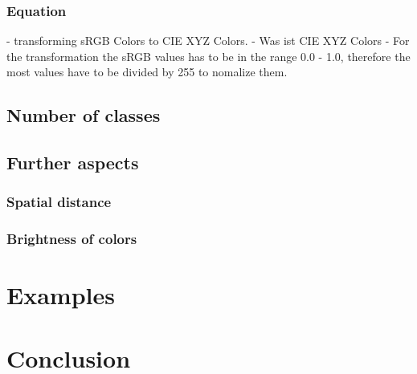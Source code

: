 \subsubsection{Equation}

- transforming sRGB Colors to CIE XYZ Colors. 
- Was ist CIE XYZ Colors
- For the transformation the sRGB values has to be in the range 0.0 - 1.0, therefore the most values have to be divided by 255 to nomalize them. 
\subsection{Number of classes}

\subsection{Further aspects}

\subsubsection{Spatial distance}

\subsubsection{Brightness of colors}

\section{Examples}

\section{Conclusion}


\parencite{brychtova2015}
\parencite{brychtova2017}
\parencite{sharma2005}
\parencite{coltekin2015}
\parencite{coltekin2017}

